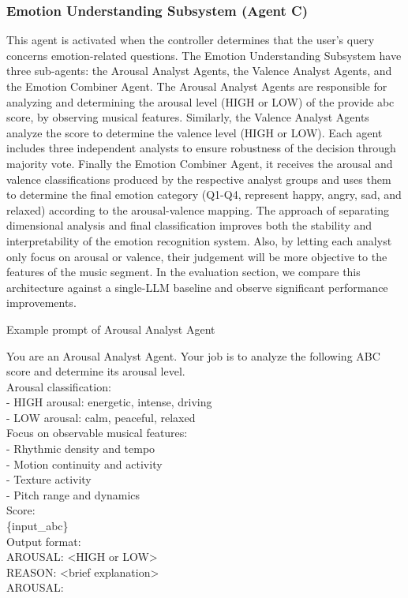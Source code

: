 \documentclass[sigconf]{acmart}
\begin{document}
\subsubsection{Emotion Understanding Subsystem (Agent C)}
This agent is activated when the controller determines that the user's query concerns emotion-related questions. The Emotion Understanding Subsystem have three sub-agents: the Arousal Analyst Agents, the Valence Analyst Agents, and the Emotion Combiner Agent. The Arousal Analyst Agents are responsible for analyzing and determining the arousal level (HIGH or LOW) of the provide abc score, by observing musical features. Similarly, the Valence Analyst Agents analyze the score to determine the valence level (HIGH or LOW). Each agent includes three independent analysts to ensure robustness of the decision through majority vote. Finally the Emotion Combiner Agent, it receives the arousal and valence classifications produced by the respective analyst groups and uses them to determine the final emotion category (Q1-Q4, represent happy, angry, sad, and relaxed) according to the arousal-valence mapping. The approach of separating dimensional analysis and final classification improves both the stability and interpretability of the emotion recognition system. Also, by letting each analyst only focus on arousal or valence, their judgement will be more objective to the features of the music segment. In the evaluation section, we compare this architecture against a single-LLM baseline and observe significant performance improvements.

\begin{promptbox}{Example prompt of Arousal Analyst Agent}

You are an Arousal Analyst Agent. Your job is to analyze the following ABC score and determine its arousal level.\\

Arousal classification:\\
- HIGH arousal: energetic, intense, driving\\
- LOW arousal: calm, peaceful, relaxed\\

Focus on observable musical features:\\
- Rhythmic density and tempo\\
- Motion continuity and activity\\
- Texture activity\\
- Pitch range and dynamics\\

Score:\\
\{input\_abc\}\\

Output format:\\
AROUSAL: <HIGH or LOW>\\
REASON: <brief explanation>\\

AROUSAL:
\end{promptbox}
\end{document}
